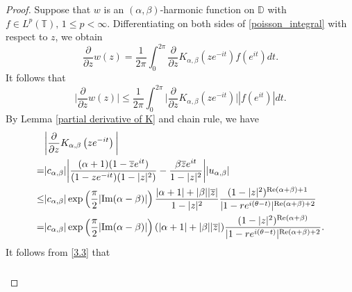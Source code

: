 \documentclass[11pt, reqno]{amsart}
\theoremstyle{definition}
\numberwithin{equation}{section}
\newcommand{\abs}[1]{\left\vert#1\right\vert}
\theoremstyle{remark}
\numberwithin{equation}{section}
\newcommand{\ID}{{\mathbb D}}
\begin{document}
	\begin{proof}
		Suppose that $w$ is an $(\alpha,\beta)$-harmonic function on $\mathbb{D}$  with $f\in L^p(\mathbb{T}),\, 1\leq p< \infty$. %
		Differentiating on both sides of \eqref{poisson_integral} with respect to $z$, we obtain 
					$$\frac{\partial}{\partial z}w(z)=\frac{1}{2\pi} \int_0^{2\pi} \frac{\partial}{\partial z}K_{\alpha,\beta}\left(z e^{-it}\right) f\left(e^{it}\right) dt.$$
		It follows that 
		\begin{equation}\label{3.3}
		\bigg|\frac{\partial}{\partial z}w(z)\bigg|\leq \frac{1}{2\pi} \int_0^{2\pi}\bigg|\frac{\partial}{\partial z}K_{\alpha,\beta}\left(z e^{-it}\right)\bigg|\abs{f\left(e^{it}\right)}dt.
		\end{equation}
		By Lemma \ref{partial derivative of K} and chain rule, we have
		\begin{align*}
        \begin{split}
			&\bigg|\frac{\partial}{\partial z}K_{\alpha,\beta}\left(z e^{-it}\right)\bigg|\\=&|c_{\alpha,\beta}|\bigg|\frac{(\alpha+1)(1-\overline{z}e^{it})}{(1-ze^{-it})(1-|z|^2)}-\frac{\beta\overline{z}e^{it}}{1-|z|^2}\bigg||u_{\alpha,\beta}|\\\leq&|c_{\alpha,\beta}|\exp\left(\frac{\pi}{2}|\text{\rm Im}(\alpha-\beta)|\right)\frac{|\alpha+1|+|\beta||\overline{z}|}{1-|z|^2}\frac{(1-|z|^2)^{\text{\rm Re}(\alpha+\beta)+1}}{|1-re^{i(\theta-t)}|^{\text{\rm Re}(\alpha+\beta)+2}}\\=& |c_{\alpha,\beta}|\exp\left(\frac{\pi}{2}|\text{\rm Im}(\alpha-\beta)|\right)(|\alpha+1|+|\beta||\overline{z}|)\frac{(1-|z|^2)^{\text{Re}(\alpha+\beta)}}{|1-re^{i(\theta-t)}|^{\text{\rm Re}(\alpha+\beta)+2}}.
            \end{split}
		\end{align*} 
		It follows from \eqref{3.3} that
	\begin{align*}
    \begin{split}

\end{split}
\end{align*}
\end{proof}
\end{document}
